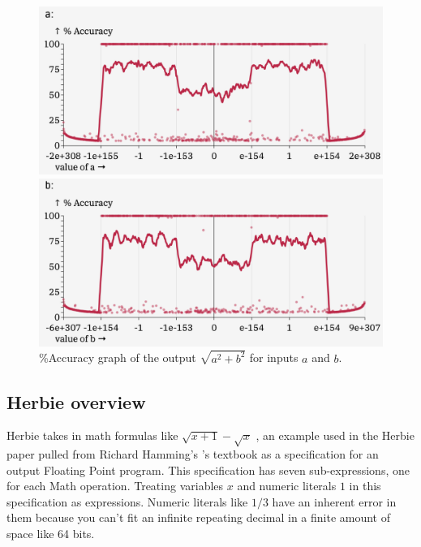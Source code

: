 \documentclass{article}
\begin{document}
\begin{figure}[ht]
\centering
\begin{minipage}{0.45\textwidth}
  \includegraphics[width=\textwidth]{hypot-error-a.png}
\end{minipage}
\hfill
\begin{minipage}{0.45\textwidth}
  \includegraphics[width=\textwidth]{hypot-error-b.png}
\end{minipage}
\caption{\%Accuracy graph of the output $\sqrt{a^2 + b^2}$ for inputs $a$ and $b$.}
\label{fig:hypot-error-graph}
\end{figure}

\subsection{Herbie overview}


Herbie takes in math formulas like $\sqrt{x + 1} - \sqrt{x}$ , an example used in the Herbie paper pulled from Richard Hamming's \cite{Hamming}'s textbook as a specification for an output Floating Point program. This specification has seven sub-expressions, one for each Math operation. Treating variables $x$ and numeric literals $1$  in this specification as expressions. Numeric literals like $1/3$ have an inherent error in them because you can't fit an infinite repeating decimal in a finite amount of space like 64 bits. 
\end{document}
